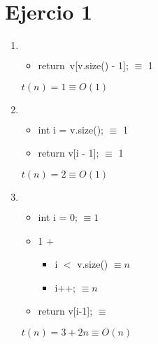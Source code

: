 \documentclass{article}
\begin{document}
\section*{Ejercio 1}

\begin{enumerate}
    \item $ $
        
        \begin{itemize}
            \item return\ v[v.size() - 1]; $\equiv$ 1
        \end{itemize}
        $t(n) = 1 \equiv O(1)$
    \item $ $
        
        \begin{itemize}
            \item int i = v.size(); $\equiv$ 1
            \item return v[i - 1]; $\equiv$ 1
        \end{itemize}
        $t(n) = 2 \equiv O(1)$
    \item $ $
        
        \begin{itemize}
            \item int i = 0; $\equiv 1$
            \item 1 +
            \begin{itemize}
                \item i $<$ v.size() $\equiv n$
                \item i++; $\equiv n$
            \end{itemize}
            \item return v[i-1]; $\equiv $
        \end{itemize}
        $t(n)= 3 + 2n \equiv O(n)$
\end{enumerate}
\end{document}

